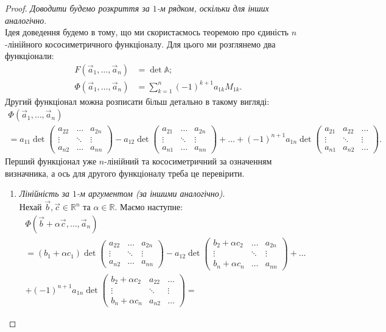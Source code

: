 \documentclass{math_library}
\begin{document}
\begin{proof}
\textit{Доводити будемо розкриття за $1$-м рядком, оскільки для інших аналогічно}.\\
Ідея доведення будемо в тому, що ми скористаємось теоремою про єдиність $n$-лінійного кососиметричного функціоналу. Для цього ми розглянемо два функціонали:
\begin{align*}
F(\vec{a}_1,\dots,\vec{a}_n) & = \det \mathbb{A}; \\
\Phi(\vec{a}_1,\dots, \vec{a}_n) & = \sum_{k=1}^n (-1)^{k+1} a_{1k}M_{1k}.
\end{align*}
Другий функціонал можна розписати більш детально в такому вигляді:
\begin{multline*}
\Phi(\vec{a}_1,\dots, \vec{a}_n) \\ = a_{11} \det \begin{pmatrix} a_{22} & \dots & a_{2n} \\ \vdots & \ddots & \vdots \\ a_{n2} & \dots & a_{nn} \end{pmatrix} - a_{12} \det \begin{pmatrix} a_{21} & \dots & a_{2n} \\ \vdots & \ddots & \vdots \\ a_{n1} & \dots & a_{nn} \end{pmatrix} + \dots + (-1)^{n+1} a_{1n} \det \begin{pmatrix} a_{21} & a_{22} & \dots \\ \vdots & \ddots & \vdots \\ a_{n1} & a_{n2} & \dots \end{pmatrix}.
\end{multline*}
Перший функціонал уже $n$-лінійний та кососиметричний за означенням визначника, а ось для другого функціоналу треба це перевірити.
\begin{enumerate}[wide=0pt,label={\Roman*.}]
\item \textit{Лінійність за $1$-м аргументом (за іншими аналогічно)}.\\
Нехай $\vec{b}, \vec{c} \in \mathbb{R}^n$ та $\alpha \in \mathbb{R}$. Маємо наступне:
\begin{multline*}
\Phi(\vec{b}+\alpha \vec{c},\dots,\vec{a}_n) \\
= (b_1 + \alpha c_1) \det \begin{pmatrix} a_{22} & \dots & a_{2n} \\ \vdots & \ddots & \vdots \\ a_{n2} & \dots & a_{nn} \end{pmatrix} - a_{12} \det \begin{pmatrix} b_2 + \alpha c_2 & \dots & a_{2n} \\ \vdots & \ddots & \vdots \\ b_n + \alpha c_n & \dots & a_{nn} \end{pmatrix} + \dots \\ + (-1)^{n+1} a_{1n} \det \begin{pmatrix} b_2 + \alpha c_2 & a_{22} & \dots \\ \vdots & \ddots & \vdots \\ b_n + \alpha c_n & a_{n2} & \dots \end{pmatrix} \boxed{=}

\end{multline*}
\end{enumerate}
\end{proof}
\end{document}

